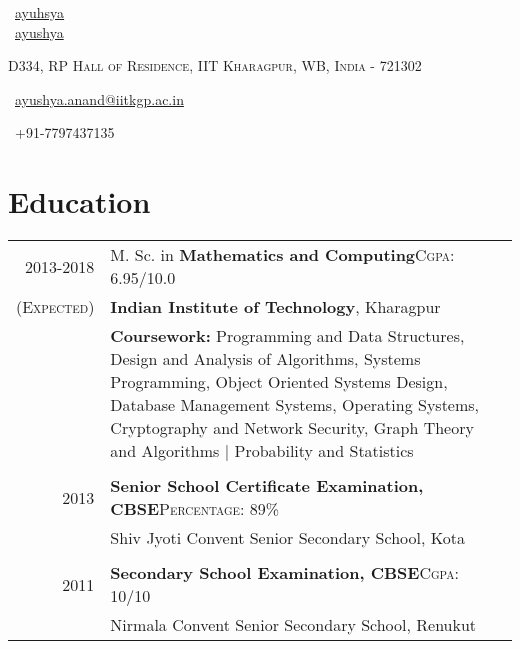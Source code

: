 \documentclass[a4paper,11pt]{extarticle} %
\begin{document}
\pagestyle{empty} %


\begin{multicols}{3}
\normalsize \faGithub\ {\href{https://github.com/ayuhsya}{ayuhsya}}\\
\normalsize  \faLinkedinSquare\ {\href{https://www.linkedin.com/in/ayushya}{ayushya}}\\
\columnbreak
\normalsize\par{\par} %
\par{\centering\footnotesize {\textsc{D334, RP Hall of Residence, IIT Kharagpur, WB, India - 721302}}\hfill\par}
\columnbreak
\raggedright\hfill\normalsize \faEnvelope\ {\href{mailto:ayushya.anand@iitkgp.ac.in}{ayushya.anand@iitkgp.ac.in}}\\
\raggedright\hfill{\faPhone\ +91-7797437135}
\end{multicols}


\vspace{-0.6cm}
\section{Education}

\begin{tabular}{r|p{17.5cm}}	
2013-2018 & M. Sc. in \textbf{Mathematics and Computing}\hfill\textsc{Cgpa}: 6.95/10.0\\
\textsc{(Expected)}&\textbf{Indian Institute of Technology}, Kharagpur\\
& \footnotesize{\textbf{Coursework: }{Programming and Data Structures, Design and Analysis of Algorithms, Systems Programming, Object Oriented Systems Design, Database
Management Systems, Operating Systems, Cryptography and Network Security, Graph Theory and Algorithms | Probability and Statistics}}\\
\multicolumn{2}{c}{} \\
2013 & \textbf{Senior School Certificate Examination, CBSE}\hfill\textsc{Percentage}: 89\%\\
& \footnotesize{Shiv Jyoti Convent Senior Secondary School, Kota}\\
\multicolumn{2}{c}{} \\
2011 & \textbf{Secondary School Examination, CBSE}\hfill\textsc{Cgpa}: 10/10\\
& \footnotesize{Nirmala Convent Senior Secondary School, Renukut}\\
\end{tabular}
\end{document}
